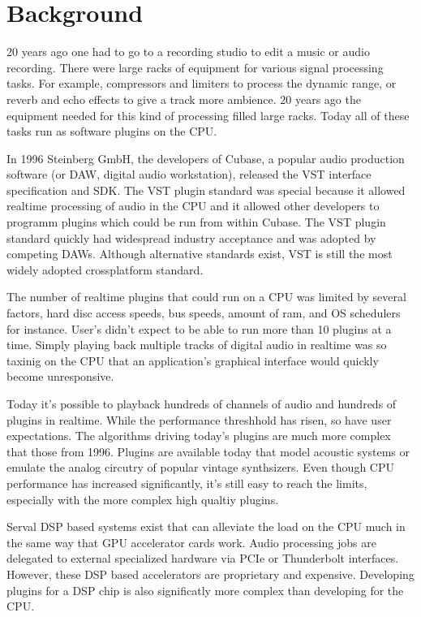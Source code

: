 \section{Background}

20 years ago one had to go to a recording studio to edit a music or audio recording. There were large racks of equipment for various signal processing tasks. For example, compressors and limiters to process the dynamic range, or reverb and echo effects to give a track more ambience.
20 years ago the equipment needed for this kind of processing filled large racks. Today all of these tasks run as software plugins on the CPU.

In 1996 Steinberg GmbH, the developers of Cubase, a popular audio production software (or DAW, digital audio workstation), released the VST interface specification and SDK.\cite{VST-wikipedia} The VST plugin standard was special because it allowed realtime processing of audio in the CPU and it allowed other developers to programm plugins which could be run from within Cubase. The VST plugin standard quickly had widespread industry acceptance and was adopted by competing DAWs. Although alternative standards exist, VST is still the most widely adopted crossplatform standard.

The number of realtime plugins that could run on a CPU was limited by several factors, hard disc access speeds, bus speeds, amount of ram, and OS schedulers for instance\cite{brandt1998low}. User's didn't expect to be able to run more than 10 plugins at a time. Simply playing back multiple tracks of digital audio in realtime was so taxinig on the CPU that an application's graphical interface would quickly become unresponsive.

Today it's possible to playback hundreds of channels of audio and hundreds of plugins in realtime. While the performance threshhold has risen, so have user expectations. The algorithms driving today's plugins are much more complex that those from 1996. Plugins are available today that model acoustic systems or emulate the analog circutry of popular vintage synthsizers. Even though CPU performance has increased significantly, it's still easy to reach the limits, especially with the more complex high qualtiy plugins.

Serval DSP based systems exist that can alleviate the load on the CPU much in the same way that GPU accelerator cards work. Audio processing jobs are delegated to external specialized hardware via PCIe or Thunderbolt interfaces. However, these DSP based accelerators are proprietary and expensive. Developing plugins for a DSP chip is also significatly more complex than developing for the CPU.

